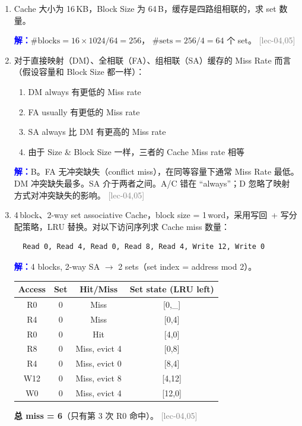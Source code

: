 \documentclass[11pt,a4paper]{article}
\newcommand{\lec}[1]{\textcolor{gray}{[lec-#1]}}
\newcommand{\ans}{\par\noindent\textcolor{blue}{\textbf{解：}}}
\begin{document}
\begin{enumerate}[leftmargin=*,itemsep=8pt]
\item Cache 大小为 16\,KB，Block Size 为 64\,B，缓存是四路组相联的，求 set 数量。

  \ans $\text{\#blocks}=16\times1024/64=256$，
  $\text{\#sets}=256/4=64$ 个 set。 \lec{04,05}

\item 对于直接映射（DM）、全相联（FA）、组相联（SA）缓存的 Miss Rate 而言
  （假设容量和 Block Size 都一样）：

  \begin{enumerate}[label=\Alph*.]
    \item DM always 有更低的 Miss rate
    \item FA usually 有更低的 Miss rate
    \item SA always 比 DM 有更高的 Miss rate
    \item 由于 Size \& Block Size 一样，三者的 Cache Miss rate 相等
  \end{enumerate}

  \ans B。FA 无冲突缺失（conflict miss），在同等容量下通常 Miss Rate 最低。
  DM 冲突缺失最多。SA 介于两者之间。A/C 错在 ``always''；D 忽略了映射
  方式对冲突缺失的影响。 \lec{04,05}

\item 4\,block、2-way set associative Cache，block size = 1\,word，采用写回~+
  写分配策略，LRU 替换。对以下访问序列求 Cache miss 数量：

  \begin{verbatim}
  Read 0, Read 4, Read 0, Read 8, Read 4, Write 12, Write 0
  \end{verbatim}

  \ans 4 blocks, 2-way SA $\to$ 2 sets（set index = address mod 2）。

  \begin{tabular}{c|c|c|c}
  Access & Set & Hit/Miss & Set state (LRU left) \\
  \midrule
  R0 & 0 & Miss & [0,\_] \\
  R4 & 0 & Miss & [0,4] \\
  R0 & 0 & Hit  & [4,0] \\
  R8 & 0 & Miss, evict 4 & [0,8] \\
  R4 & 0 & Miss, evict 0 & [8,4] \\
  W12& 0 & Miss, evict 8 & [4,12] \\
  W0 & 0 & Miss, evict 4 & [12,0] \\
  \end{tabular}

  \textbf{总 miss = 6}（只有第 3 次 R0 命中）。 \lec{04,05}


\end{enumerate}
\end{document}
